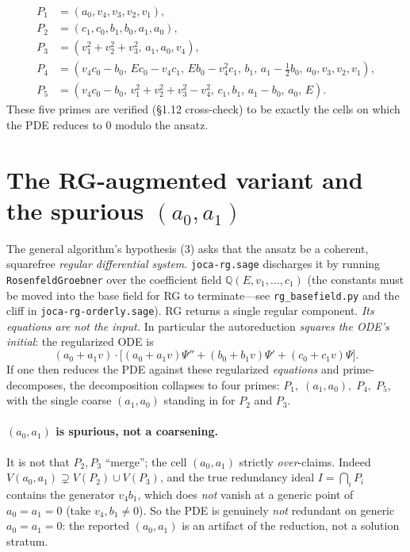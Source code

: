 \documentclass[11pt]{article}
\newcommand{\code}[1]{\texttt{#1}}
\begin{document}
\begin{equation}
\label{eq:five}
\begin{aligned}
P_1 &= (a_0,v_4,v_3,v_2,v_1),\\
P_2 &= (c_1,c_0,b_1,b_0,a_1,a_0),\\
P_3 &= (v_1^2{+}v_2^2{+}v_3^2,\,a_1,a_0,v_4),\\
P_4 &= (v_4c_0{-}b_0,\,Ec_0{-}v_4c_1,\,Eb_0{-}v_4^2c_1,\,b_1,\,a_1{-}\tfrac12 b_0,\,a_0,v_3,v_2,v_1),\\
P_5 &= (v_4c_0{-}b_0,\,v_1^2{+}v_2^2{+}v_3^2{-}v_4^2,\,c_1,b_1,\,a_1{-}b_0,\,a_0,\,E).
\end{aligned}
\end{equation}
These five primes are verified (§1.12 cross-check) to be exactly the cells on
which the PDE reduces to $0$ modulo the ansatz.

\section{The RG-augmented variant and the spurious \texorpdfstring{$(a_0,a_1)$}{(a0,a1)}}

The general algorithm's hypothesis (3) asks that the ansatz be a coherent,
squarefree \emph{regular differential system}. \code{joca-rg.sage} discharges it
by running \code{RosenfeldGroebner} over the coefficient field
$\mathbb{Q}(E,v_1,\dots,c_1)$ (the constants must be moved into the base field
for RG to terminate---see \code{rg\_basefield.py} and the cliff in
\code{joca-rg-orderly.sage}). RG returns a single regular component. \emph{Its
equations are not the input.} In particular the autoreduction
\emph{squares the ODE's initial}: the regularized ODE is
\begin{equation}
\label{eq:squared}
   (a_0+a_1v)\cdot\bigl[(a_0+a_1v)\Psi''+(b_0+b_1v)\Psi'+(c_0+c_1v)\Psi\bigr].
\end{equation}
If one then reduces the PDE against these regularized \emph{equations} and
prime-decomposes, the decomposition collapses to four primes:
$P_1,\;(a_1,a_0),\;P_4,\;P_5$, with the single coarse $(a_1,a_0)$ standing in for
$P_2$ and $P_3$.

\paragraph{$(a_0,a_1)$ is spurious, not a coarsening.} It is not that $P_2,P_3$
``merge''; the cell $(a_0,a_1)$ strictly \emph{over}-claims. Indeed
$V(a_0,a_1)\supsetneq V(P_2)\cup V(P_3)$, and the true redundancy ideal
$I=\bigcap_i P_i$ contains the generator $v_4 b_1$, which does \emph{not} vanish
at a generic point of $a_0=a_1=0$ (take $v_4,b_1\neq0$). So the PDE is genuinely
\emph{not} redundant on generic $a_0=a_1=0$: the reported $(a_0,a_1)$ is an
artifact of the reduction, not a solution stratum.
\end{document}
